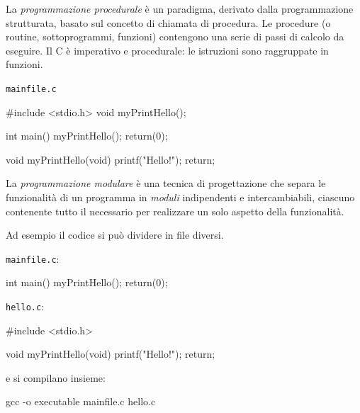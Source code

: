 \documentclass[11pt,a4paper]{article}
\begin{document}
\begin{definizione}
La \emph{programmazione procedurale} è un paradigma, derivato dalla
programmazione strutturata, basato sul concetto di chiamata di procedura. Le
procedure (o routine, sottoprogrammi, funzioni) contengono una serie di passi di
calcolo da eseguire. Il C è imperativo e procedurale: le istruzioni sono
raggruppate in funzioni.
\end{definizione}

\begin{esempio}
\texttt{mainfile.c}
\begin{codice}
#include <stdio.h>
void myPrintHello();

int main() {
    myPrintHello();
    return(0);
}

void myPrintHello(void) {
    printf("Hello!\n");
    return;
}
\end{codice}
\end{esempio}

\begin{definizione}
La \emph{programmazione modulare} è una tecnica di progettazione che separa le
funzionalità di un programma in \emph{moduli} indipendenti e intercambiabili,
ciascuno contenente tutto il necessario per realizzare un solo aspetto della
funzionalità.
\end{definizione}

Ad esempio il codice si può dividere in file diversi.

\texttt{mainfile.c}:
\begin{codice}
int main() {
    myPrintHello();
    return(0);
}
\end{codice}

\texttt{hello.c}:
\begin{codice}
#include <stdio.h>

void myPrintHello(void) {
    printf("Hello!\n");
    return;
}
\end{codice}

e si compilano insieme:
\begin{comando}
gcc -o executable mainfile.c hello.c
\end{comando}
\end{document}
